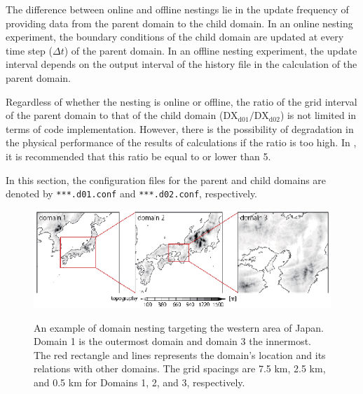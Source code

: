 The difference between online and offline nestings lie in the update frequency of providing data from the parent domain to the child domain. In an online nesting experiment, the boundary conditions of the child domain are updated at every time step ($\Delta t$) of the parent domain. In an offline nesting experiment, the update interval depends on the output interval of the history file in the calculation of the parent domain. 

Regardless of whether the nesting is online or offline, the ratio of the grid interval of the parent domain to that of the child domain  ($\mathrm{DX}_{\mathrm{d01}}/\mathrm{DX}_{\mathrm{d02}}$) is not limited in terms of code implementation. However, there is the possibility of degradation in the physical performance of the results of calculations if the ratio is too high. In \scalerm, it is recommended that this ratio be equal to or lower than 5.

In this section, the configuration files for the parent and child domains
are denoted by \verb|***.d01.conf| and \verb|***.d02.conf|, respectively.

\begin{figure}[t]
\begin{center}
  \includegraphics[width=1.0\hsize]{./figure/nesting_sample.eps}\\
  \caption{An example of domain nesting targeting the western area of Japan.
    Domain 1 is the outermost domain and domain 3 the innermost.
    The red rectangle and lines represents the domain’s location and its relations with other domains.
    The grid spacings are 7.5 km, 2.5 km, and 0.5 km for Domains 1, 2, and 3, respectively.
  }
  \label{fig_nestsample}
\end{center}
\end{figure}



